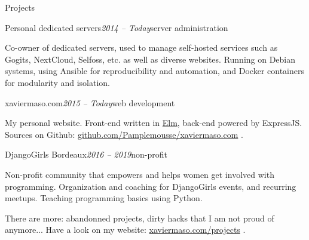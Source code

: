 \begin{rSection}{Projects}

  \begin{rSubsection}{Personal dedicated servers}{\em 2014 -- Today}{server administration}{}
    \item[] Co-owner of dedicated servers, used to manage self-hosted services such as Gogits, NextCloud, Selfoss, etc. as well as diverse websites.
            Running on Debian systems, using Ansible for reproducibility and automation, and Docker containers for modularity and isolation.
  \end{rSubsection}

  \begin{rSubsection}{xaviermaso.com}{\em 2015 -- Today}{web development}{}
    \item[] My personal website. Front-end written in \href{http://elm-lang.org/}{Elm}, back-end powered by ExpressJS. \\
            Sources on Github: \href{https://github.com/Pamplemousse/xaviermaso.com}{github.com/Pamplemousse/xaviermaso.com} .
  \end{rSubsection}

  \begin{rSubsection}{DjangoGirls Bordeaux}{\em 2016 -- 2019}{non-profit}{}
    \item[] Non-profit community that empowers and helps women get involved with programming.
            Organization and coaching for DjangoGirls events, and recurring meetups. Teaching programming basics using Python.
  \end{rSubsection}

  \item[]
    There are more: abandonned projects, dirty hacks that I am not proud of anymore... Have a look on my website: \href{http://xaviermaso.com/projects}{xaviermaso.com/projects} .

\end{rSection}
